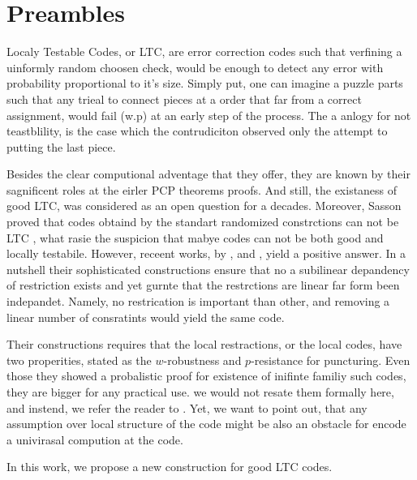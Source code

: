 \section{Preambles}

Localy Testable Codes, or LTC, are error correction codes such that verfining a uinformly random choosen check, would be enough to detect any error with probability proportional to it's size. Simply put, one can imagine a puzzle parts such that any trieal to connect pieces at a order that far from a correct assignment, would fail (w.p) at an early step of the process. The a anlogy for not teastblility, is the case which the contrudiciton observed only the attempt to putting the last piece.     

Besides the clear computional adventage that they offer, they are known by their sagnificent roles at the eirler PCP theorems proofs. And still, the existaness of good LTC, was considered as an open question for a decades. Moreover, Sasson proved that codes obtaind by the standart randomized constrctions can not be LTC \cite{Sasson}, what rasie the suspicion that mabye codes can not be both good and locally testabile. However, receent works, by \cite{Dinur}, \cite{Pavel} and \cite{leverrier2022quantum}, yield a positive answer. In a nutshell their sophisticated constructions ensure that no a subilinear depandency of restriction exists and yet gurnte that the restrctions are linear far form been indepandet. Namely, no restrication is important than other, and removing a linear number of consratints would yield the same code.  

Their constructions requires that the local restractions, or the local codes, have two properities, stated as the $w$-robustness and $p$-resistance for puncturing. Even those they showed a probalistic proof for existence of inifinte familiy such codes, they are bigger for any practical use. we would not resate them formally here, and instend, we refer the reader to \cite{leverrier2022quantum}. Yet, we want to point out, that any assumption over local structure of the code might be also an obstacle for encode a univirasal compution at the code. 

In this work, we propose a new construction for good LTC codes. 

